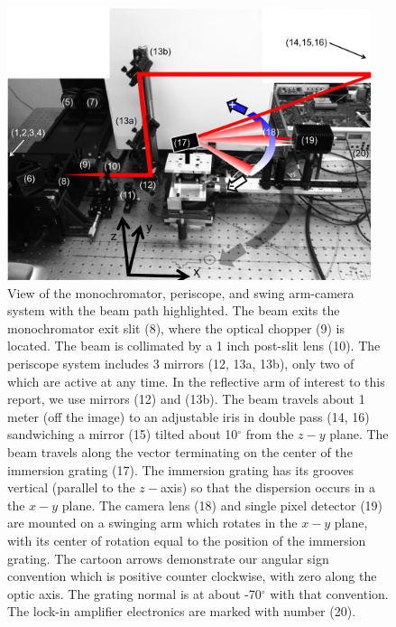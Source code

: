 \begin{figure}
\begin{center}
    \includegraphics[width=0.95\textwidth]{chSPIE_2012_CA1/figs/GTA_cam_model_ref_tilt.jpg}
  \end{center}
  \caption[Schematic of the CROWBAR: Custom Robotic Order, Wavelength, and Blaze Angle Recorder]{\label{fig:GTAview} View of the monochromator, periscope, and swing arm-camera system with the beam path highlighted.  The beam exits the monochromator exit slit (8), where the optical chopper (9) is located.  The beam is collimated by a 1 inch post-slit lens (10).  The periscope system includes 3 mirrors (12, 13a, 13b), only two of which are active at any time.  In the reflective arm of interest to this report, we use mirrors (12) and (13b).  The beam travels about 1 meter (off the image) to an adjustable iris in double pass (14, 16) sandwiching a mirror (15) tilted about 10$^\circ$ from the $z-y$ plane.  The beam travels along the vector terminating on the center of the immersion grating (17).  The immersion grating has its grooves vertical (parallel to the $z-$axis) so that the dispersion occurs in a the $x-y$ plane.  The camera lens (18) and single pixel detector (19) are mounted on a swinging arm which rotates in the $x-y$ plane, with its center of rotation equal to the position of the immersion grating.  The cartoon arrows demonstrate our angular sign convention which is positive counter clockwise, with zero along the optic axis.  The grating normal is at about -70$^\circ$ with that convention.  The lock-in amplifier electronics are marked with number (20).}
\end{figure}

